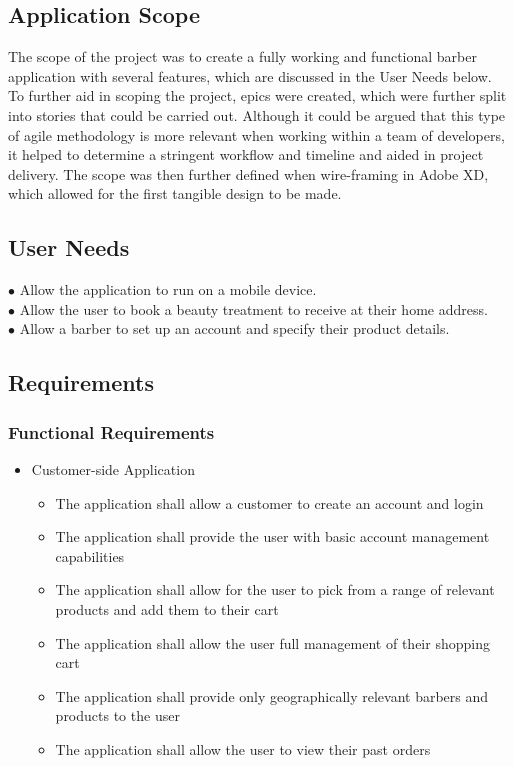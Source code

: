 \documentclass[12pt]{article}
\begin{document}
	\subsection{Application Scope}
	The scope of the project was to create a fully working and functional barber application with several features, which are discussed in the User Needs below. To further aid in scoping the project, epics were created, which were further split into stories that could be carried out. Although it could be argued that this type of agile methodology is more relevant when working within a team of developers, it helped to determine a stringent workflow and timeline and aided in project delivery.
	The scope was then further defined when wire-framing in Adobe XD, which allowed for the first tangible design to be made.
	
	\subsection{User Needs}
	$\bullet$ Allow the application to run on a mobile device.
	\\
	$\bullet$ Allow the user to book a beauty treatment to receive at their home address.
	\\
	$\bullet$ Allow a barber to set up an account and specify their product details.

	\subsection{Requirements}
	\subsubsection{Functional Requirements}
	
	\begin{itemize}
		\item Customer-side Application
		\begin{itemize}
			\item The application shall allow a customer to create an account and login
			\item The application shall provide the user with basic account management capabilities
			\item The application shall allow for the user to pick from a range of relevant products and add them to their cart
			\item The application shall allow the user full management of their shopping cart
			\item The application shall provide only geographically relevant barbers and products to the user
			\item The application shall allow the user to view their past orders
			
		\end{itemize}
	\end{itemize}
\end{document}
